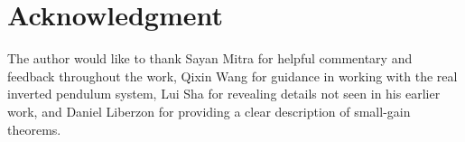 \documentclass[conference]{IEEEtran}
\begin{document}


\section*{Acknowledgment}
The author would like to thank Sayan Mitra for helpful commentary and feedback throughout the work, Qixin Wang for guidance in working with the real inverted pendulum system, Lui Sha for revealing details not seen in his earlier work, and Daniel Liberzon for providing a clear description of small-gain theorems.






%






\end{document}
